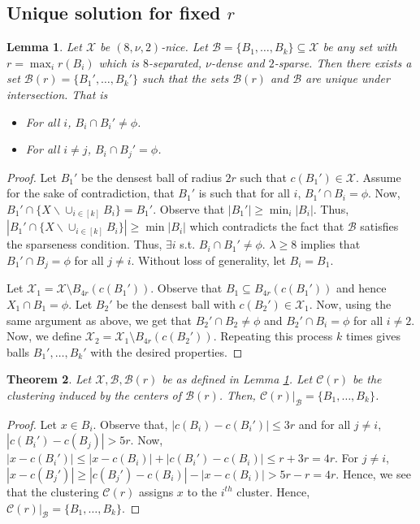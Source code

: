 \documentclass[twoside]{article}
\newcommand{\mc}{\mathcal}
\newtheorem{theorem}{Theorem}
\newtheorem{lemma}[theorem]{Lemma}
\begin{document}
\subsection{Unique solution for fixed $r$}
\begin{lemma}
\label{lemma:uniqueR}
Let $\mc X$ be $(8, \nu, 2)$-nice. Let $\mc B = \{B_1,\ldots, B_k\} \subseteq \mc X$ be any set with $r = \max_i r(B_i)$ which is $8$-separated, $\nu$-dense and $2$-sparse. Then there exists a set $\mc B(r) = \{B_1',\ldots,B_k'\}$ such that the sets $\mc B(r)$ and $\mc B$ are unique under intersection. That is 
\begin{itemize}[nolistsep]
\item For all $i$, $B_i \cap B_i' \neq \phi$. 
\item For all $i\neq j$, $B_i \cap B_j' = \phi$.
\end{itemize}
\end{lemma} 
\begin{proof}
Let $B_1'$ be the densest ball of radius $2r$ such that $c(B_1') \in \mc X$. Assume for the sake of contradiction, that $B_1'$ is such that for all $i$, $B_1' \cap B_i = \phi$. Now, $B_1' \cap \{X \backslash \cup_{i\in[k]} B_i\} = B_1'$. Observe that $|B_1'| \ge \min_i |B_i|$. Thus, $|B_1' \cap \{X \backslash \cup_{i\in[k]} B_i\}| \ge \min |B_i|$ which contradicts the fact that $\mc B$ satisfies the sparseness condition. Thus, $\exists i$ s.t. $B_i \cap B_1' \neq \phi$. $\lambda \ge 8$ implies that $B_1' \cap B_j = \phi$ for all $j \neq i$. Without loss of generality, let $B_i = B_1$. 

Let $\mc X_1 = \mc X \setminus B_{4r}(c(B_1'))$. Observe that $B_1 \subseteq B_{4r}(c(B_1'))$ and hence $X_1 \cap B_1 = \phi$. Let $B_2'$ be the densest ball with $c(B_2') \in \mc X_1$. Now, using the same argument as above, we get that $B_2' \cap B_2 \neq \phi$ and $B_2' \cap B_i = \phi$ for all $i\neq 2$. Now, we define $\mc X_2 = \mc X_1 \setminus B_{4r}(c(B_2'))$. Repeating this process $k$ times gives balls $B_1', \ldots, B_k'$ with the desired properties.
\end{proof}

\begin{theorem}
\label{theorem:uniqueR}
Let $\mc X, \mc B, \mc B(r)$ be as defined in Lemma \ref{lemma:uniqueR}. Let $\mc C(r)$ be the clustering induced by the centers of $\mc B(r)$. Then, $\mc C(r)|_{\mc B} = \{B_1, \ldots, B_k\}$. 
\end{theorem}
\begin{proof}
Let $x \in B_i$. Observe that, $|c(B_i)-c(B_i')| \le 3r$ and for all $j\neq i$, $|c(B_i')-c(B_j)| > 5r$. Now, $|x-c(B_i')| \le |x-c(B_i)| + |c(B_i')-c(B_i)| \le r+3r = 4r$. For $j \neq i$, $|x-c(B_j')| \ge |c(B_j')-c(B_i)| - |x-c(B_i)| > 5r - r = 4r$. Hence, we see that the clustering $\mc C(r)$ assigns $x$ to the $i^{th}$ cluster. Hence, $\mc C(r)|_\mc B = \{B_1,\ldots,B_k\}$.
\end{proof}
\end{document}
